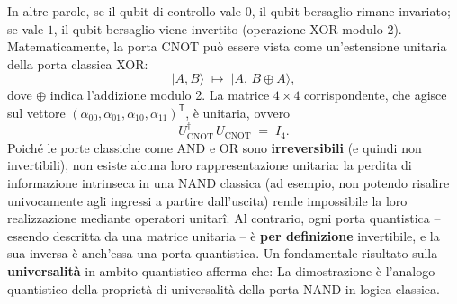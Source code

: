 \documentclass[a4paper,12pt]{report}
\theoremstyle{plain}
\begin{document}
In altre parole, se il qubit di controllo vale $0$, il qubit bersaglio rimane invariato; se vale $1$, il qubit bersaglio viene invertito (operazione XOR modulo 2).
Matematicamente, la porta CNOT può essere vista come un'estensione unitaria della porta classica XOR:
\[
|A,B\rangle \;\mapsto\; |A,\,B \oplus A\rangle,
\]
dove $\oplus$ indica l'addizione modulo 2. La matrice $4\times4$ corrispondente, che agisce sul vettore $(\alpha_{00},\alpha_{01},\alpha_{10},\alpha_{11})^\mathsf{T}$, è unitaria, ovvero
\[
U_{\mathrm{CNOT}}^\dagger\,U_{\mathrm{CNOT}} \;=\; I_4.
\]
Poiché le porte classiche come AND e OR sono \textbf{irreversibili} (e quindi non invertibili), non esiste alcuna loro rappresentazione unitaria: la perdita di informazione intrinseca in una NAND classica (ad esempio, non potendo risalire univocamente agli ingressi a partire dall'uscita) rende impossibile la loro realizzazione mediante operatori unitarî. Al contrario, ogni porta quantistica -- essendo descritta da una matrice unitaria -- è \textbf{per definizione} invertibile, e la sua inversa è anch'essa una porta quantistica.
Un fondamentale risultato sulla \textbf{universalità} in ambito quantistico afferma che:
\vspace{0.3cm}
\noindent{}
\vspace{0.3cm}
\noindent La dimostrazione è l'analogo quantistico della proprietà di universalità della porta NAND in logica classica.
\end{document}

